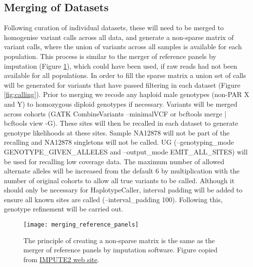 \subsection{Merging of Datasets}
Following curation of individual datasets, these will need to be merged to homogenise variant calls across all data, and generate a non-sparse matrix of variant calls, where the union of variants across all samples is available for each population. This process is similar to the merger of reference panels by imputation (Figure \ref{fig:merging_reference_panels}), which could have been used, if raw reads had not been available for all populations. In order to fill the sparse matrix a union set of calls will be generated for variants that have passed filtering in each dataset (Figure \ref{fig:calling}). Prior to merging we recode any haploid male genotypes (non-PAR X and Y) to homozygous diploid genotypes if necessary. %
Variants will be merged across cohorts (GATK CombineVariants --minimalVCF or bcftools merge | bcftools view -G). These sites will then be recalled in each dataset to generate genotype likelihoods at these sites. Sample NA12878 will not be part of the recalling and NA12878 singletons will not be called.
UG (--genotyping\_mode GENOTYPE\_GIVEN\_ALLELES and --output\_mode EMIT\_ALL\_SITES) will be used for recalling low coverage data.
The maximum number of allowed alternate alleles will be increased from the default 6 by multiplication with the number of original cohorts to allow all true variants to be called. Although it should only be necessary for HaplotypeCaller, interval padding will be added to ensure all known sites are called (--interval\_padding 100).
Following this, genotype refinement will be carried out.

\begin{figure}[!htbp]
\centering
\texttt{[image: merging\_reference\_panels]}
\caption{The principle of creating a non-sparse matrix is the same as the merger of reference panels by imputation software. Figure copied from \href{http://mathgen.stats.ox.ac.uk/impute/merging\_reference\_panels.png}{IMPUTE2 web site}.}
\label{fig:merging_reference_panels}
\end{figure}
